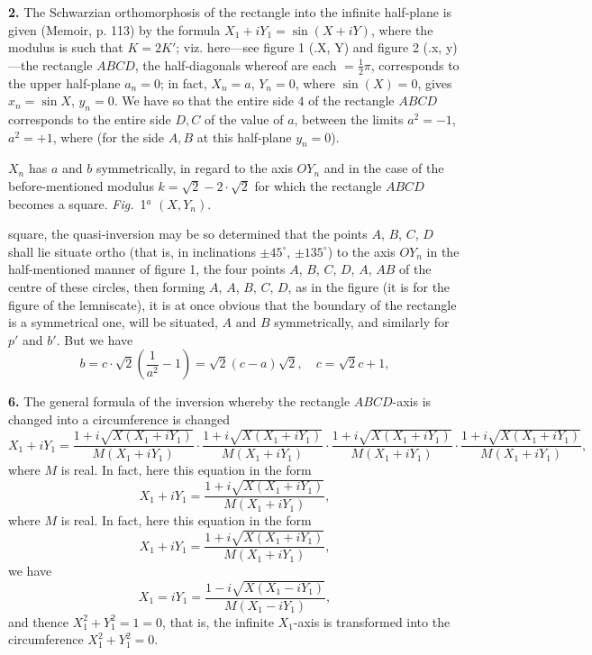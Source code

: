 \documentclass[11pt,a4paper]{article}
\begin{document}
\textbf{2.} The Schwarzian orthomorphosis of the rectangle into the infinite half-plane is given (Memoir, p. 113) by the formula $X_1 + iY_1 = \sin (X + iY)$, where the modulus is such that $K = 2K'$; viz. here---see figure 1 (.X, Y) and figure 2 (.x, y)---the rectangle $ABCD$, the half-diagonals whereof are each $= \frac{1}{2}\pi$, corresponds to the upper half-plane $a_n = 0$; in fact, $X_n = a$, $Y_n = 0$, where $\sin(X) = 0$, gives $x_n = \sin X$, $y_n = 0$. We have so that the entire side $4$ of the rectangle $ABCD$ corresponds to the entire side $D, C$ of the value of $a$, between the limits $a^2 = - 1$, $a^2 = + 1$, where (for the side $A, B$ at this half-plane $y_n = 0$).

$X_n$ has $a$ and $b$ symmetrically, in regard to the axis $OY_n$ and in the case of the before-mentioned modulus $k = \sqrt{2} - 2 \cdot \sqrt{2}$ for which the rectangle $ABCD$ becomes a square. \textit{Fig.}\ 1$^a$ $(X, Y_n)$.

square, the quasi-inversion may be so determined that the points $A$, $B$, $C$, $D$ shall lie situate ortho (that is, in inclinations $\pm 45^\circ$, $\pm 135^\circ$) to the axis $OY_n$ in the half-mentioned manner of figure 1, the four points $A$, $B$, $C$, $D$, $A$, $A B$ of the centre of these circles, then forming $A$, $A$, $B$, $C$, $D$, as in the figure (it is for the figure of the lemniscate), it is at once obvious that the boundary of the rectangle is a symmetrical one, will be situated, $A$ and $B$ symmetrically, and similarly for $p'$ and $b'$. But we have
\[
b = c \cdot \sqrt{2}\left(\frac{1}{a^2} - 1\right) = \sqrt{2}(c - a)\sqrt{2}, \quad c = \sqrt{2}c + 1,
\]

\textbf{6.} The general formula of the inversion whereby the rectangle $ABCD$-axis is changed into a circumference is changed
\[
X_1 + iY_1 = \frac{1 + i\sqrt{X(X_1 + iY_1)}}{M(X_1 + iY_1)} \cdot \frac{1 + i\sqrt{X(X_1 + iY_1)}}{M(X_1 + iY_1)} \cdot \frac{1 + i\sqrt{X(X_1 + iY_1)}}{M(X_1 + iY_1)} \cdot \frac{1 + i\sqrt{X(X_1 + iY_1)}}{M(X_1 + iY_1)},
\]
where $M$ is real. In fact, here this equation in the form
\[
X_1 + iY_1 = \frac{1 + i\sqrt{X(X_1 + iY_1)}}{M(X_1 + iY_1)},
\]
where $M$ is real. In fact, here this equation in the form
\[
X_1 + iY_1 = \frac{1 + i\sqrt{X(X_1 + iY_1)}}{M(X_1 + iY_1)},
\]
we have
\[
X_1 = iY_1 = \frac{1 - i\sqrt{X(X_1 - iY_1)}}{M(X_1 - iY_1)},
\]
and thence $X_1^2 + Y_1^2 = 1 = 0$, that is, the infinite $X_1$-axis is transformed into the circumference $X_1^2 + Y_1^2 = 0$.
\end{document}
